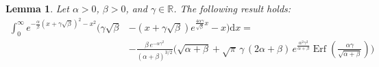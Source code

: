 \documentclass[journal]{IEEEtran}
\theoremstyle{plain}
\newtheorem{lemma}[theorem]{Lemma}
\theoremstyle{definition}
\theoremstyle{remark}
\newcommand{\R}{\mathbb{R}}
\newcommand{\Erf}{\operatorname{Erf}}
\newcommand{\dd}{\mathrm{d}}
\begin{document}
\begin{lemma} \label{lemma:I2221}
Let $\alpha > 0$, $\beta > 0$, and $\gamma \in \R$. The following result holds:
\begin{equation}
\begin{split}
    \int_{0}^\infty e^{-\frac{\alpha}{\beta}  \left(x + \gamma\sqrt{\beta } \right)^2 - x^2} \biggl( \gamma\sqrt{\beta } &-\left(x + \gamma\sqrt{\beta } \right) e^{\frac{4 \alpha  \gamma }{\sqrt{\beta }} x} - x\biggr)  \dd x = \\& -\frac{\beta \, e^{-\alpha  \gamma ^2} }{(\alpha +\beta )^{3/2}} \biggl(\sqrt{\alpha +\beta } +\sqrt{\pi } \,\gamma \, (2 \alpha +\beta ) \, e^{\frac{\alpha ^2 \gamma ^2}{\alpha +\beta }} \Erf\left(\frac{\alpha  \gamma }{\sqrt{\alpha +\beta }}\right)\biggr)
\end{split}
\end{equation}
\end{lemma}
\end{document}
